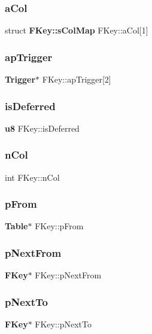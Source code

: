 \subsubsection{aCol}
{\footnotesize\ttfamily struct \textbf{ F\+Key\+::s\+Col\+Map}  F\+Key\+::a\+Col[1]}

\mbox{\label{struct_f_key_a9ce15cb27b675836bc714ab18fd8a008}} 
\subsubsection{apTrigger}
{\footnotesize\ttfamily \textbf{ Trigger}$\ast$ F\+Key\+::ap\+Trigger[2]}

\mbox{\label{struct_f_key_ab742714b17f2c13353837e1fdde51cc7}} 
\subsubsection{isDeferred}
{\footnotesize\ttfamily \textbf{ u8} F\+Key\+::is\+Deferred}

\mbox{\label{struct_f_key_a611e3223f3f434e0a635e036dc100cbb}} 
\subsubsection{nCol}
{\footnotesize\ttfamily int F\+Key\+::n\+Col}

\mbox{\label{struct_f_key_a6d476f3fbfa75a19c5c5a9edec4e79eb}} 
\subsubsection{pFrom}
{\footnotesize\ttfamily \textbf{ Table}$\ast$ F\+Key\+::p\+From}

\mbox{\label{struct_f_key_ac64ff66b30167715c8822a74c2809075}} 
\subsubsection{pNextFrom}
{\footnotesize\ttfamily \textbf{ F\+Key}$\ast$ F\+Key\+::p\+Next\+From}

\mbox{\label{struct_f_key_ac29b26999113602e7e3921bf07643c04}} 
\subsubsection{pNextTo}
{\footnotesize\ttfamily \textbf{ F\+Key}$\ast$ F\+Key\+::p\+Next\+To}


